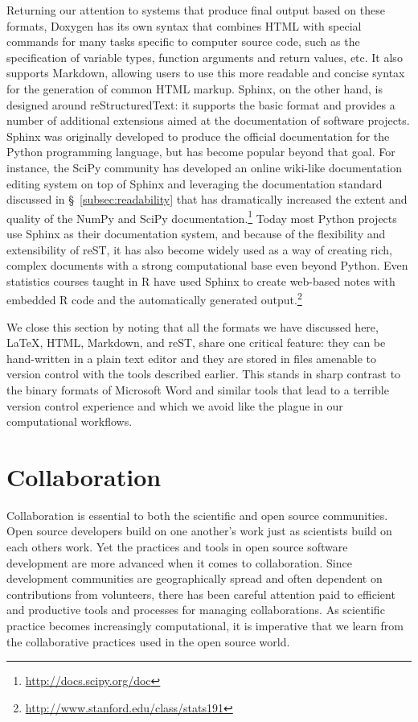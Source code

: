 \documentclass[ChapterTOCs,krantz2]{krantz} %
\begin{document}
Returning our attention to systems that produce final output based
on these formats, Doxygen has its own syntax that combines HTML with special
commands for many tasks specific to computer source code, such as the
specification of variable types, function arguments and return values, etc.  It
also supports Markdown, allowing users to use this more readable and concise
syntax for the generation of common HTML markup.  Sphinx, on the other hand, is
designed around reStructuredText: it supports the basic format and provides a
number of additional extensions aimed at the documentation of software
projects. Sphinx was originally developed to produce the official documentation
for the Python programming language, but has become popular
beyond that goal. For instance, the SciPy community has developed an online
wiki-like documentation editing system \cite{SciPyProceedings_27} on top of
Sphinx and leveraging the documentation standard discussed in §~\ref{subsec:readability}
that has dramatically increased the extent and quality of the NumPy and SciPy
documentation.\footnote{\url{http://docs.scipy.org/doc}}  Today most Python
projects use Sphinx as their documentation
system, and because of the flexibility and extensibility of reST, it has also
become widely used as a way of creating rich, complex documents with a strong
computational base even beyond Python. Even statistics courses taught in R
have used Sphinx to create web-based notes with embedded R code and the automatically
generated output.\footnote{\url{http://www.stanford.edu/class/stats191}}

We close this section by noting that all the formats we have discussed
here, \LaTeX{}, HTML, Markdown, and reST, share one critical feature: they can
be hand-written in a plain text editor and they are stored in files amenable to
version control with the tools described earlier.  This stands in sharp
contrast to the binary formats of Microsoft Word and similar tools that lead to
a terrible version control experience and which we avoid like the plague in our
computational workflows.

\section{\label{sec:collaboration}Collaboration}

Collaboration is essential to both the scientific and open source communities.
Open source developers build on one another's work just as scientists build on
each others work.  Yet the practices and tools in open source software
development are more advanced when it comes to collaboration. Since
development communities are geographically spread and often dependent on
contributions from volunteers, there has been careful attention paid to
efficient and productive tools and processes for managing collaborations.  As
scientific practice becomes increasingly computational, it is imperative that
we learn from the collaborative practices used in the open source world.
\end{document}
